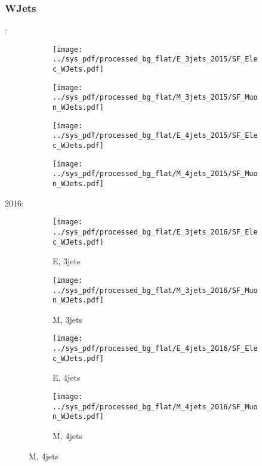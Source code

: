 \documentclass{beamer}
\begin{document}
\begin{frame}
\frametitle{WJets}
\fontsize{5}{1}:
\begin{figure}
\centering
\begin{subfigure}[b]{0.24\textwidth}
\texttt{[image: ../sys\_pdf/processed\_bg\_flat/E\_3jets\_2015/SF\_Elec\_WJets.pdf]}
\end{subfigure}
\begin{subfigure}[b]{0.24\textwidth}
\texttt{[image: ../sys\_pdf/processed\_bg\_flat/M\_3jets\_2015/SF\_Muon\_WJets.pdf]}
\end{subfigure}
\begin{subfigure}[b]{0.24\textwidth}
\texttt{[image: ../sys\_pdf/processed\_bg\_flat/E\_4jets\_2015/SF\_Elec\_WJets.pdf]}
\end{subfigure}
\begin{subfigure}[b]{0.24\textwidth}
\texttt{[image: ../sys\_pdf/processed\_bg\_flat/M\_4jets\_2015/SF\_Muon\_WJets.pdf]}
\end{subfigure}
\end{figure}
2016:
\begin{figure}
\centering
\begin{subfigure}[b]{0.24\textwidth}
\texttt{[image: ../sys\_pdf/processed\_bg\_flat/E\_3jets\_2016/SF\_Elec\_WJets.pdf]}
\captionsetup{font=tiny}
\caption{E, 3jets}
\end{subfigure}
\begin{subfigure}[b]{0.24\textwidth}
\texttt{[image: ../sys\_pdf/processed\_bg\_flat/M\_3jets\_2016/SF\_Muon\_WJets.pdf]}
\captionsetup{font=tiny}
\caption{M, 3jets}
\end{subfigure}
\begin{subfigure}[b]{0.24\textwidth}
\texttt{[image: ../sys\_pdf/processed\_bg\_flat/E\_4jets\_2016/SF\_Elec\_WJets.pdf]}
\captionsetup{font=tiny}
\caption{E, 4jets}
\end{subfigure}
\begin{subfigure}[b]{0.24\textwidth}
\texttt{[image: ../sys\_pdf/processed\_bg\_flat/M\_4jets\_2016/SF\_Muon\_WJets.pdf]}
\captionsetup{font=tiny}
\caption{M, 4jets}
\end{subfigure}
\end{figure}
\end{frame}
\end{document}
